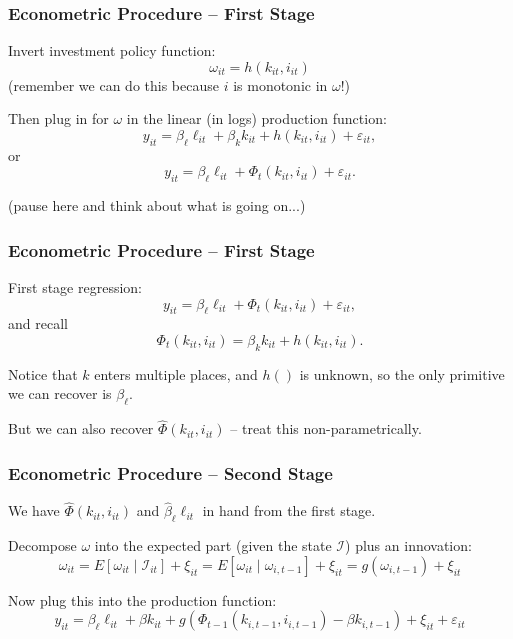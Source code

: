 \documentclass[11pt, aspectratio=169]{beamer}
\newenvironment{wideitemize}{\itemize\addtolength{\itemsep}{10pt}}{\enditemize}
\begin{document}
\begin{frame}[c]\frametitle{Econometric Procedure -- First Stage}
    
\begin{wideitemize}
	\item Invert investment policy function: 
	$$\omega_{it} = h(k_{it},i_{it})$$
	(remember we can do this because $i$ is monotonic in $\omega$!)
	\item Then plug in for $\omega$ in the linear (in logs) production function:
	$$	y_{it} = \beta_{\ell} \ell_{it} + \beta_k k_{it} + h(k_{it},i_{it}) + \varepsilon_{it},$$
	or
	$$	y_{it} = \beta_{\ell} \ell_{it} + \Phi_t(k_{it},i_{it}) + \varepsilon_{it}.$$
	\item \footnotesize(pause here and think about what is going on...)
\end{wideitemize}

\end{frame}


\begin{frame}[c]\frametitle{Econometric Procedure -- First Stage}
    
\begin{wideitemize}
	\item First stage regression:
	$$	y_{it} = \beta_{\ell} \ell_{it} + \Phi_t(k_{it},i_{it}) + \varepsilon_{it},$$
	and recall
	$$\Phi_t(k_{it},i_{it}) = \beta_k k_{it} + h(k_{it},i_{it}).$$
	\item Notice that $k$ enters multiple places, and $h()$ is unknown, so the only primitive we can recover is $\beta_{\ell}$. 
	\item But we can also recover $\hat{\Phi}(k_{it},i_{it})$ -- treat this non-parametrically.
\end{wideitemize}

\end{frame}


\begin{frame}[c]\frametitle{Econometric Procedure -- Second Stage}
    
\begin{wideitemize}
	\item We have $\hat{\Phi}(k_{it},i_{it})$ and $\hat{\beta}_{\ell} \ell_{it}$ in hand from the first stage. 
	\item Decompose $\omega$ into the expected part (given the state $\mathcal{I}$) plus an innovation: 
	$$\omega_{it} = E[\omega_{it}\mid\mathcal{I}_{it}] + \xi_{it} = E[\omega_{it}\mid\omega_{i,t-1}] + \xi_{it} = g(\omega_{i,t-1}) + \xi_{it}$$
	\item Now plug this into the production function:
	$$y_{it} = \beta_{\ell} \ell_{it} + \beta k_{it} + g(\Phi_{t-1}(k_{i,t-1},i_{i,t-1})-\beta k_{i,t-1}) + \xi_{it} + \varepsilon_{it}$$

\end{wideitemize}


\end{frame}
\end{document}
